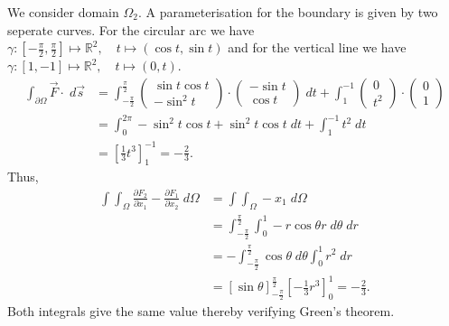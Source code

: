 \documentclass[11pt]{article}
\begin{document}
\begin{solution}
    We consider domain $\Omega_2$. A parameterisation for the boundary is given by two seperate curves. For the circular arc we have $\gamma: [-\frac{\pi}{2},\frac{\pi}{2}] \mapsto \mathbb{R}^2, \quad t\mapsto  (\cos t, \sin t)$ and for the vertical line we have  $\gamma: [1,-1] \mapsto \mathbb{R}^2, \quad t\mapsto  (0, t)$. 
    \begin{align*}
        \int_{\partial \Omega} \vec{F} \cdot \;d\vec{s} 
        &= 
        \int_{-\frac{\pi}{2}}^{\frac{\pi}{2}} 
        \begin{pmatrix}\sin t \cos t\\ -\sin^2 t \end{pmatrix} 
        \cdot 
        \begin{pmatrix}-\sin t \\ \cos t \end{pmatrix} \; d t 
        + 
        \int_1^ {-1} 
        \begin{pmatrix} 0 \\ t^2 \end{pmatrix}
        \cdot 
        \begin{pmatrix} 0 \\ 1 \end{pmatrix}
        \\&
        = 
        \int_0^{2\pi} -\sin^2 t\cos t + \sin^ 2 t \cos t \;dt + \int_{1}^ {-1} t^ 2 \;d t
        \\&
        = \left[\frac{1}{3} t^ 3\right]_1^ {-1}
        = -\frac{2}{3}
        .
    \end{align*}
    Thus, 
    \begin{align*}
        \int \int_{\Omega} \frac{\partial F_2}{\partial x_1} - \frac{\partial F_1}{\partial x_2} \;d \Omega &= \int \int_{\Omega} -x_1 \; d\Omega
        \\&= \int_{-\frac{\pi}{2}}^ {\frac{\pi}{2}} \int_0^1 -r\cos \theta r \;d\theta\;dr
        \\&= -\int_{-\frac{\pi}{2}}^ {\frac{\pi}{2}} \cos \theta \;d \theta \int_0^1 r^ 2 \;d r
        \\&= \left[\sin \theta\right]_{-\frac{\pi}{2}}^ {\frac{\pi}{2}} \left[-\frac{1}{3}r^ 3\right]_0^{1} = -\frac{2}{3}
        .
    \end{align*}
    Both integrals give the same value thereby verifying Green's theorem.
\end{solution}
\end{document}
